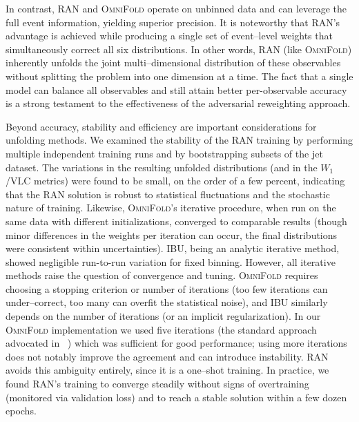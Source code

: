 {{            %
            In contrast, RAN and \textsc{OmniFold} operate on unbinned data and can leverage the full event information, yielding superior precision.
            It is noteworthy that RAN’s advantage is achieved while producing a single set of event--level weights that simultaneously correct all six distributions.
            In other words, RAN (like \textsc{OmniFold}) inherently unfolds the joint multi--dimensional distribution of these observables without splitting the problem into one dimension at a time.
            The fact that a single model can balance all observables and still attain better per-observable accuracy is a strong testament to the effectiveness of the adversarial reweighting approach.

            Beyond accuracy, stability and efficiency are important considerations for unfolding methods.
            We examined the stability of the RAN training by performing multiple independent training runs and by bootstrapping subsets of the jet dataset.
            The variations in the resulting unfolded distributions (and in the $W_1$/VLC metrics) were found to be small, on the order of a few percent, indicating that the RAN solution is robust to statistical fluctuations and the stochastic nature of training.
            Likewise, \textsc{OmniFold}’s iterative procedure, when run on the same data with different initializations, converged to comparable results (though minor differences in the weights per iteration can occur, the final distributions were consistent within uncertainties).
            IBU, being an analytic iterative method, showed negligible run-to-run variation for fixed binning.
            However, all iterative methods raise the question of convergence and tuning.
            \textsc{OmniFold} requires choosing a stopping criterion or number of iterations (too few iterations can under--correct, too many can overfit the statistical noise), and IBU similarly depends on the number of iterations (or an implicit regularization).
            In our \textsc{OmniFold} implementation we used five iterations (the standard approach advocated in ~) which was sufficient for good performance; using more iterations does not notably improve the agreement and can introduce instability.
            RAN avoids this ambiguity entirely, since it is a one--shot training.
            In practice, we found RAN’s training to converge steadily without signs of overtraining (monitored via validation loss) and to reach a stable solution within a few dozen epochs.
}}
